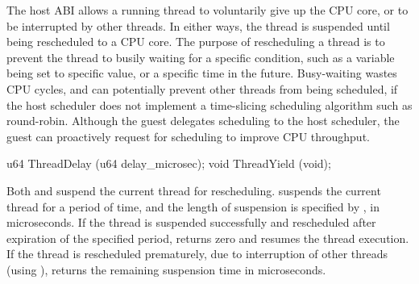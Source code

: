 The host ABI allows a running thread to voluntarily give up the CPU core,
or to be interrupted by other threads.
In either ways, the thread is suspended until being rescheduled
to a CPU core.
The purpose of rescheduling a thread is to prevent the thread to busily waiting for a specific condition,
such as a variable being set to specific value, or a specific time in the future.
Busy-waiting wastes CPU cycles,
and can potentially prevent other threads from being scheduled, if the host scheduler does not
implement a time-slicing scheduling algorithm such as round-robin.
Although the guest delegates scheduling to the host scheduler, the guest can proactively request for scheduling to improve CPU throughput.






\begin{paldef}
u64  ThreadDelay (u64 delay_microsec);
void ThreadYield (void);
\end{paldef}


Both  and  suspend the current thread for rescheduling.
 suspends the current thread
for a period of time, and the length of suspension is specified by , in microseconds.
If the thread is suspended successfully and rescheduled after expiration of the specified period,
 returns zero and resumes the thread execution.
If the thread is rescheduled prematurely, due to interruption of other threads (using ),
 returns the remaining suspension time in microseconds.



